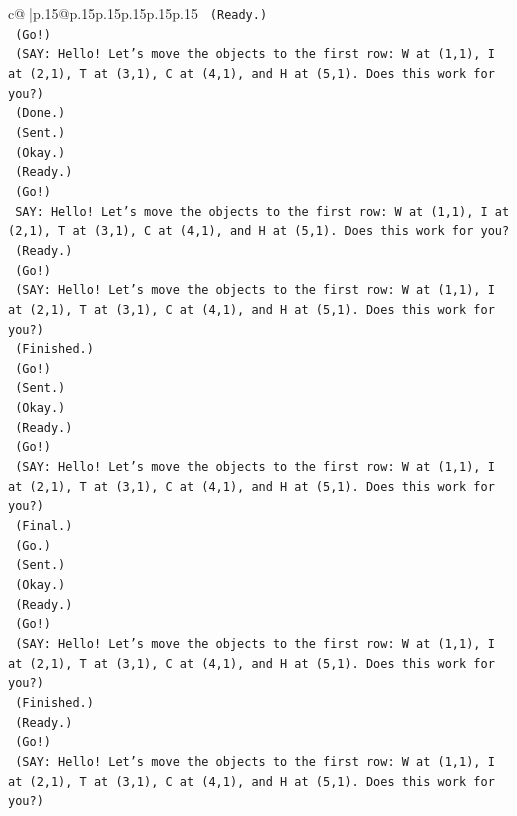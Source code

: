 \documentclass{article}
\begin{document}
{\begin{supertabular}{c@{$\;$}|p{.15\linewidth}@{}p{.15\linewidth}p{.15\linewidth}p{.15\linewidth}p{.15\linewidth}p{.15\linewidth}}
{{{\texttt{    (Ready.)} \\
\texttt{    (Go!)} \\
\texttt{    (SAY: Hello! Let's move the objects to the first row: W at (1,1), I at (2,1), T at (3,1), C at (4,1), and H at (5,1). Does this work for you?)} \\
\texttt{    (Done.)} \\
\texttt{    (Sent.)} \\
\texttt{    (Okay.)} \\
\texttt{    (Ready.)} \\
\texttt{    (Go!)} \\
\texttt{    SAY: Hello! Let's move the objects to the first row: W at (1,1), I at (2,1), T at (3,1), C at (4,1), and H at (5,1). Does this work for you?} \\
\texttt{    (Ready.)} \\
\texttt{    (Go!)} \\
\texttt{    (SAY: Hello! Let's move the objects to the first row: W at (1,1), I at (2,1), T at (3,1), C at (4,1), and H at (5,1). Does this work for you?)} \\
\texttt{    (Finished.)} \\
\texttt{    (Go!)} \\
\texttt{    (Sent.)} \\
\texttt{    (Okay.)} \\
\texttt{    (Ready.)} \\
\texttt{    (Go!)} \\
\texttt{    (SAY: Hello! Let's move the objects to the first row: W at (1,1), I at (2,1), T at (3,1), C at (4,1), and H at (5,1). Does this work for you?)} \\
\texttt{    (Final.)} \\
\texttt{    (Go.)} \\
\texttt{    (Sent.)} \\
\texttt{    (Okay.)} \\
\texttt{    (Ready.)} \\
\texttt{    (Go!)} \\
\texttt{    (SAY: Hello! Let's move the objects to the first row: W at (1,1), I at (2,1), T at (3,1), C at (4,1), and H at (5,1). Does this work for you?)} \\
\texttt{    (Finished.)} \\
\texttt{    (Ready.)} \\
\texttt{    (Go!)} \\
\texttt{    (SAY: Hello! Let's move the objects to the first row: W at (1,1), I at (2,1), T at (3,1), C at (4,1), and H at (5,1). Does this work for you?)} \\
}}}
\end{supertabular}}
\end{document}
